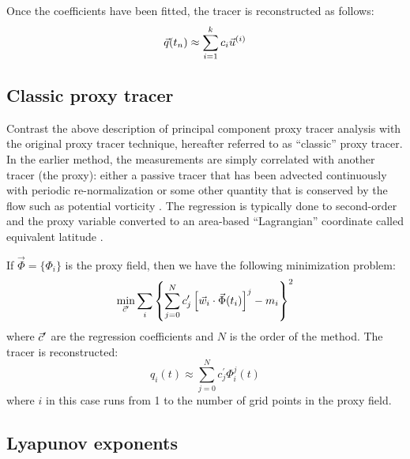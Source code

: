 Once the coefficients have been fitted, the tracer is reconstructed as follows:
\begin{equation}
	\vec q(t_n) \approx \sum_{i=1}^k c_i \vec u^{(i)}
\end{equation}

\subsection{Classic proxy tracer}

\label{classic}

Contrast the above description of principal component proxy tracer
analysis with the original proxy tracer technique, hereafter
referred to as ``classic'' proxy tracer.
In the earlier method, the measurements are simply correlated with another
tracer (the proxy): either a passive tracer that has been advected
continuously with periodic re-normalization \citep{Allen_Nakamura2003} 
or some other quantity that is conserved by the flow 
such as potential vorticity \citep{Randall_etal2002,Hoskins_etal1985}.
The regression is typically done to second-order and the proxy variable
converted to an area-based ``Lagrangian'' coordinate called
equivalent latitude \citep{Butchart_Remsberg1986}.

If $\vec \Phi=\lbrace \Phi_i \rbrace$ is the proxy field, 
then we have the following minimization problem:
\begin{equation}
  \min_{\vec c^\prime} \sum_i \left \lbrace \sum_{j=0}^N c^\prime_j \left [\vec w_i \cdot \vec \Phi(t_i) \right ]^j - m_i \right \rbrace^2
\end{equation}
where $\vec c^\prime$ are the regression coefficients 
and $N$ is the order of the method. 
The tracer is reconstructed:
\begin{equation}
	q_i(t) \approx \sum_{j=0}^N c^\prime_j \Phi_i^j(t)
\end{equation}
where $i$ in this case runs from 1 to the number of grid points in the
proxy field.

\subsection{Lyapunov exponents}

